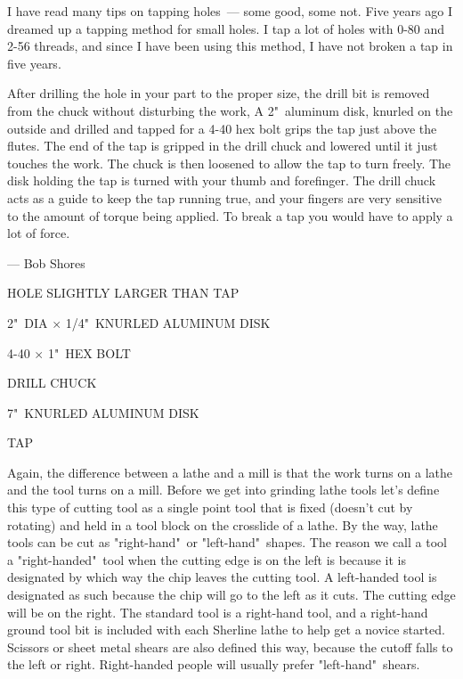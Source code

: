 
I have read many tips on tapping holes\ --- some good, some not. Five years ago
I dreamed up a tapping method for small holes. I tap a lot of holes with 0-80
and 2-56 threads, and since I have been using this method, I have not broken a
tap in five years.

After drilling the hole in your part to the proper size, the drill bit is
removed from the chuck without disturbing the work, A 2"\ aluminum disk, knurled
on the outside and drilled and tapped for a 4-40 hex bolt grips the tap just
above the flutes. The end of the tap is gripped in the drill chuck and lowered
until it just touches the work. The chuck is then loosened to allow the tap to
turn freely. The disk holding the tap is turned with your thumb and forefinger.
The drill chuck acts as a guide to keep the tap running true, and your fingers
are very sensitive to the amount of torque being applied. To break a tap you
would have to apply a lot of force.

\bigskip
--- Bob Shores
\bigskip

HOLE SLIGHTLY LARGER THAN TAP

2"\ DIA $\times$ 1/4"\ KNURLED ALUMINUM DISK

4-40 $\times$ 1"\ HEX BOLT

DRILL CHUCK

7"\ KNURLED ALUMINUM DISK

TAP
\bigskip

\secup

\secdown


Again, the difference between a lathe and a mill is that the work turns on a
lathe and the tool turns on a mill. Before we get into grinding lathe tools
let's define this type of cutting tool as a single point tool that is fixed
(doesn't cut by rotating) and held in a tool block on the crosslide of a lathe.
By the way, lathe tools can be cut as "right-hand"\ or "left-hand"\ shapes. The
reason we call a tool a "right-handed"\ tool when the cutting edge is on the left
is because it is designated by which way the chip leaves the cutting tool. A
left-handed tool is designated as such because the chip will go to the left as
it cuts. The cutting edge will be on the right. The standard tool is a
right-hand tool, and a right-hand ground tool bit is included with each Sherline
lathe to help get a novice started. Scissors or sheet metal shears are also
defined this way, because the cutoff falls to the left or right. Right-handed
people will usually prefer "left-hand"\ shears.

